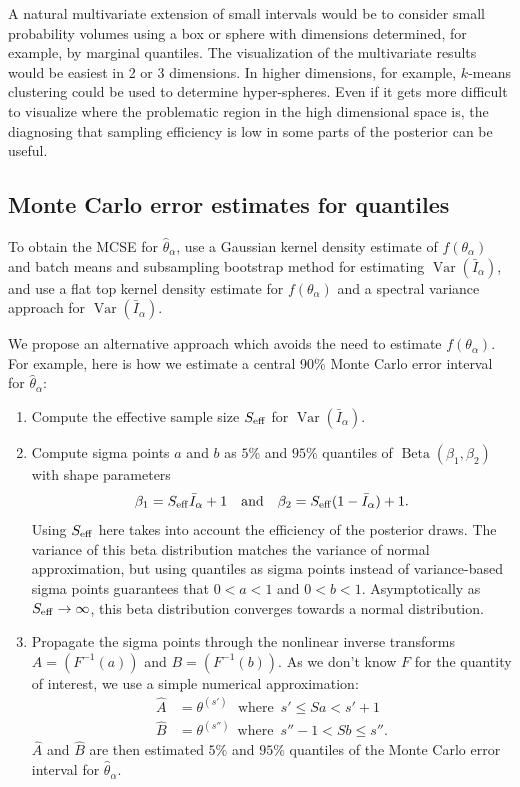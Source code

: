\documentclass[american,]{article}
\DeclareMathOperator{\Beta}{Beta}
\DeclareMathOperator{\Var}{Var}
\theoremstyle{definition}
\begin{document}
A natural multivariate extension of small intervals would be to consider
small probability volumes using a box or sphere with dimensions
determined, for example, by marginal quantiles. The visualization of
the multivariate results would be easiest in 2 or 3 dimensions. In
higher dimensions, for example, $k$-means clustering could be used to
determine hyper-spheres. Even if it gets more difficult to visualize
where the problematic region in the high dimensional space
is, the diagnosing that sampling efficiency is low in some parts of the
posterior can be useful.

\hypertarget{mcse}{%
\subsection{Monte Carlo error estimates for quantiles}\label{mcse}}

To obtain the MCSE for
\(\hat{\theta}_\alpha\), \citet{Doss+etal:2014:MCMC-quantiles} use a
Gaussian kernel density estimate of \(f(\theta_\alpha)\) and
batch means and subsampling bootstrap method for estimating
\(\Var(\bar{I}_\alpha)\), and \citet{Liu+etal:2016:MCMC-quantiles} use a
flat top kernel density estimate for \(f(\theta_\alpha)\) and a
spectral variance approach for \(\Var(\bar{I}_\alpha)\).

We propose an alternative approach which avoids the need
to estimate \(f(\theta_\alpha)\). For example,  here is how we estimate a central 90\% Monte
Carlo error interval for \(\hat{\theta}_\alpha\):
\begin{enumerate}
\def\labelenumi{\arabic{enumi}.}
\item Compute the effective sample size \(S_{\rm eff}\) for \(\Var(\bar{I}_\alpha)\).
\item Compute sigma points \citep{wan2000unscented} \(a\) and \(b\) as \(5\%\) and \(95\%\) quantiles of
  $\Beta(\beta_1,\beta_2)$ with shape parameters
  \begin{equation}
    \beta_1 = S_{\rm eff} \bar{I}_\alpha+1 \quad \text{and} \quad
    \beta_2 = S_{\rm eff} (1-\bar{I}_\alpha) + 1.
  \end{equation}
  Using $S_{\rm eff}$ here takes into account the efficiency of the
  posterior draws. The variance of this beta distribution matches the
  variance of normal approximation, but using quantiles as sigma
  points instead of variance-based sigma points guarantees that
  $0<a<1$ and $0<b<1$.  Asymptotically as
  \(S_{\rm eff} \rightarrow \infty \), this beta distribution
  converges towards a normal distribution.
\item Propagate the sigma points through the nonlinear inverse transforms $A=(F^{-1}(a))$ and $B=(F^{-1}(b))$.
  As we don't know $F$ for the quantity of interest, we use a simple numerical approximation:
  \begin{align*}
  \widehat{A} & = \theta^{(s')} \,\,\text{ where }\,  s' \leq Sa < s'+1 \\
  \widehat{B} & = \theta^{(s'')}  \,\text{ where }\,  s''-1 < Sb \leq s''.
  \end{align*}
  $\widehat{A}$ and $\widehat{B}$ are then estimated \(5\%\) and \(95\%\) quantiles of the Monte Carlo
  error interval for \(\hat{\theta}_\alpha\).
\end{enumerate}
\end{document}
